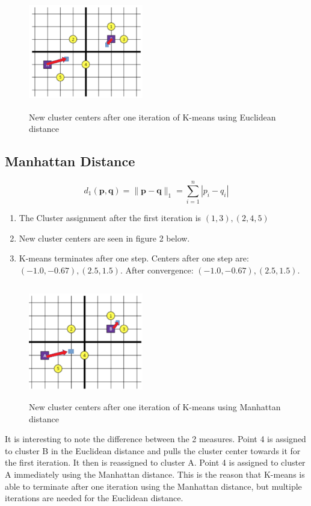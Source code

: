 \documentclass[a4paper]{article}
\begin{document}
\begin{figure}[h]	
	\centering
		\includegraphics[width=5cm, height=5cm]{Q1_euclidean.png}
		\caption{New cluster centers after one iteration of K-means using Euclidean distance}
\end{figure}


\newpage
\subsection{Manhattan Distance}


$$d_1(\mathbf{p}, \mathbf{q}) = \|\mathbf{p} - \mathbf{q}\|_1 = \sum_{i=1}^n |p_i-q_i|$$


\begin{enumerate}[label=(\alph*)]
\item The Cluster assignment after the first iteration is $(1,3), (2,4,5)$
\item New cluster centers are seen in figure 2 below.
\item K-means terminates after one step.  Centers after one step are: $(-1.0, -0.67), (2.5, 1.5)$.  After convergence: $(-1.0, -0.67), (2.5, 1.5)$.
\end{enumerate}

\begin{figure}[h]
	\centering
		\includegraphics[width=5cm, height=5cm]{Q1_manhattan.png}
		\caption{New cluster centers after one iteration of K-means using Manhattan distance}
\end{figure}


It is interesting to note the difference between the 2 measures.  Point 4 is assigned to cluster B in the Euclidean distance and pulls the cluster center towards it for the first iteration.  It then is reassigned to cluster A.  Point 4 is assigned to cluster A immediately using the Manhattan distance.  This is the reason that K-means is able to terminate after one iteration using the Manhattan distance, but multiple iterations are needed for the Euclidean distance.
\end{document}
